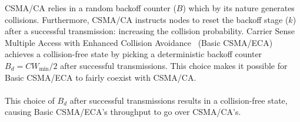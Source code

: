 \documentclass[portrait,a0paper]{baposter}
\begin{document}
\begin{poster}
{CSMA/CA relies in a random backoff counter ($B$) which by its nature generates collisions. Furthermore, CSMA/CA instructs nodes to reset the backoff stage ($k$) after a successful transmission: increasing the collision probability. Carrier Sense Multiple Access with Enhanced Collision Avoidance~\cite{CSMA_ECA} (Basic CSMA/ECA) achieves a collision-free state by picking a deterministic backoff counter $B_{d}=CW_{\min}/2$ after successful transmissions. This choice makes it possible for Basic CSMA/ECA to fairly coexist with CSMA/CA.
\\\\
This choice of $B_{d}$ after successful transmissions results in a collision-free state, causing Basic CSMA/ECA's throughput to go over CSMA/CA's.

\begin{center}
\end{center}

}
\end{poster}
\end{document}

